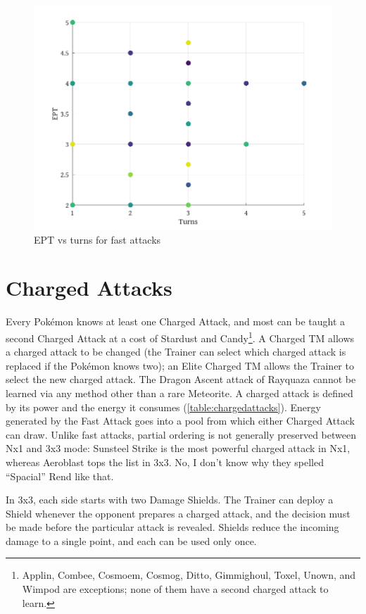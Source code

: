 \begin{figure}[hb]
\includegraphics[keepaspectratio,width=\textwidth]{octave/eptvst.png}
  \caption{EPT vs turns for fast attacks\label{fig:eptvst}}
\end{figure}

\section{Charged Attacks\label{sec:charged}}
Every Pokémon knows at least one Charged Attack, and most can be taught a second
  Charged Attack at a cost of Stardust and Candy\footnote{Applin, Combee,
  Cosmoem, Cosmog, Ditto, Gimmighoul, Toxel, Unown, and Wimpod are exceptions;
  none of them have a second charged attack to learn.}.
A Charged TM allows a charged attack to be changed (the Trainer can select
  which charged attack is replaced if the Pokémon knows two);
  an Elite Charged TM allows the Trainer to select the new charged attack.
The Dragon Ascent attack of Rayquaza cannot be learned via any method other
  than a rare Meteorite.
A charged attack is defined by its power and the energy it consumes (\autoref{table:chargedattacks}).
Energy generated by the Fast Attack goes into a pool from which either Charged Attack can draw.
Unlike fast attacks, partial ordering is not generally preserved between Nx1 and 3x3 mode:
  Sunsteel Strike is the most powerful charged attack in Nx1, whereas Aeroblast tops
  the list in 3x3.
No, I don't know why they spelled ``Spacial'' Rend like that.


In 3x3, each side starts with two Damage Shields.
The Trainer can deploy a Shield whenever the opponent prepares a charged attack,
   and the decision must be made before the particular attack is revealed.
Shields reduce the incoming damage to a single point, and each can be used only once.

